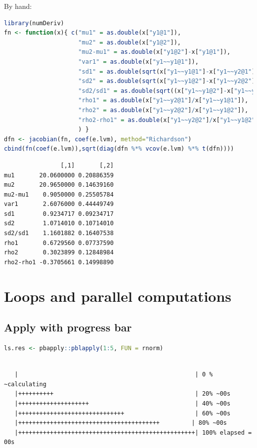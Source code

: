 \documentclass{article}
\begin{document}
By hand:
\begin{lstlisting}[language=r,numbers=none]
library(numDeriv)
fn <- function(x){ c("mu1" = as.double(x["y1@1"]),
                     "mu2" = as.double(x["y1@2"]),
                     "mu2-mu1" = as.double(x["y1@2"]-x["y1@1"]),
                     "var1" = as.double(x["y1~~y1@1"]),
                     "sd1" = as.double(sqrt(x["y1~~y1@1"]-x["y1~~y2@1"])),
                     "sd2" = as.double(sqrt(x["y1~~y1@2"]-x["y1~~y2@2"])),
                     "sd2/sd1" = as.double(sqrt((x["y1~~y1@2"]-x["y1~~y2@2"])/(x["y1~~y1@1"]-x["y1~~y2@1"]))),
                     "rho1" = as.double(x["y1~~y2@1"]/x["y1~~y1@1"]),
                     "rho2" = as.double(x["y1~~y2@2"]/x["y1~~y1@2"]),
                     "rho2-rho1" = as.double(x["y1~~y2@2"]/x["y1~~y1@2"]-x["y1~~y2@1"]/x["y1~~y1@1"])
                     ) }
dfn <- jacobian(fn, coef(e.lvm), method="Richardson")
cbind(fn(coef(e.lvm)),sqrt(diag(dfn %*% vcov(e.lvm) %*% t(dfn))))
\end{lstlisting}

\label{}
\begin{verbatim}
                [,1]       [,2]
mu1       20.0600000 0.20886359
mu2       20.9650000 0.14639160
mu2-mu1    0.9050000 0.25505784
var1       2.6076000 0.44449749
sd1        0.9234717 0.09234717
sd2        1.0714010 0.10714010
sd2/sd1    1.1601882 0.16407538
rho1       0.6729560 0.07737590
rho2       0.3023899 0.12848984
rho2-rho1 -0.3705661 0.14998890
\end{verbatim}
\section{Loops and parallel computations}
\label{sec:orga6f22b9}
\subsection{Apply with progress bar}
\label{sec:org01bc32a}

\begin{lstlisting}[language=r,numbers=none]
ls.res <- pbapply::pblapply(1:5, FUN = rnorm)
\end{lstlisting}

\label{}
\begin{verbatim}

   |                                                  | 0 % ~calculating  
   |++++++++++                                        | 20% ~00s          
   |++++++++++++++++++++                              | 40% ~00s          
   |++++++++++++++++++++++++++++++                    | 60% ~00s          
   |++++++++++++++++++++++++++++++++++++++++         | 80% ~00s          
   |++++++++++++++++++++++++++++++++++++++++++++++++++| 100% elapsed = 00s
\end{verbatim}
\end{document}
